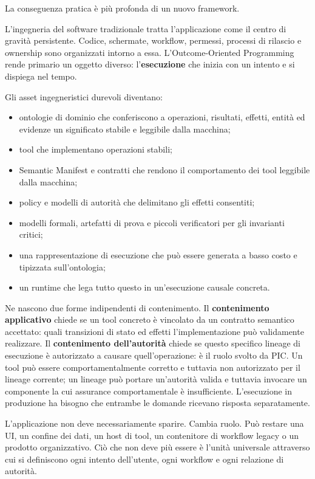 \documentclass[10pt,oneside,openany]{book}
\newcommand{\term}[1]{\textbf{#1}}
\begin{document}
La conseguenza pratica è più profonda di un nuovo framework.

L'ingegneria del software tradizionale tratta l'applicazione come il centro di gravità persistente. Codice, schermate, workflow, permessi, processi di rilascio e ownership sono organizzati intorno a essa. L'Outcome-Oriented Programming rende primario un oggetto diverso: l'\term{esecuzione} che inizia con un intento e si dispiega nel tempo.

Gli asset ingegneristici durevoli diventano:

\begin{itemize}
\item ontologie di dominio che conferiscono a operazioni, risultati, effetti, entità ed evidenze un significato stabile e leggibile dalla macchina;
\item tool che implementano operazioni stabili;
\item Semantic Manifest e contratti che rendono il comportamento dei tool leggibile dalla macchina;
\item policy e modelli di autorità che delimitano gli effetti consentiti;
\item modelli formali, artefatti di prova e piccoli verificatori per gli invarianti critici;
\item una rappresentazione di esecuzione che può essere generata a basso costo e tipizzata sull'ontologia;
\item un runtime che lega tutto questo in un'esecuzione causale concreta.
\end{itemize}

Ne nascono due forme indipendenti di contenimento. Il \term{contenimento applicativo} chiede se un tool concreto è vincolato da un contratto semantico accettato: quali transizioni di stato ed effetti l'implementazione può validamente realizzare. Il \term{contenimento dell'autorità} chiede se questo specifico lineage di esecuzione è autorizzato a causare quell'operazione: è il ruolo svolto da PIC. Un tool può essere comportamentalmente corretto e tuttavia non autorizzato per il lineage corrente; un lineage può portare un'autorità valida e tuttavia invocare un componente la cui assurance comportamentale è insufficiente. L'esecuzione in produzione ha bisogno che entrambe le domande ricevano risposta separatamente.

L'applicazione non deve necessariamente sparire. Cambia ruolo. Può restare una UI, un confine dei dati, un host di tool, un contenitore di workflow legacy o un prodotto organizzativo. Ciò che non deve più essere è l'unità universale attraverso cui si definiscono ogni intento dell'utente, ogni workflow e ogni relazione di autorità.
\end{document}
